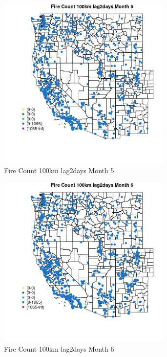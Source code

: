\begin{figure} 
\centering  
\includegraphics[width=0.77\textwidth]{Code_Outputs/Report_ML_input_PM25_Step4_part_f_de_duplicated_aveswNAs_MapObsMo5Fire_Count_100km_lag2days.jpg} 
\caption{\label{fig:Report_ML_input_PM25_Step4_part_f_de_duplicated_aveswNAsMapObsMo5Fire_Count_100km_lag2days}Fire Count 100km lag2days Month 5} 
\end{figure} 
 

\begin{figure} 
\centering  
\includegraphics[width=0.77\textwidth]{Code_Outputs/Report_ML_input_PM25_Step4_part_f_de_duplicated_aveswNAs_MapObsMo6Fire_Count_100km_lag2days.jpg} 
\caption{\label{fig:Report_ML_input_PM25_Step4_part_f_de_duplicated_aveswNAsMapObsMo6Fire_Count_100km_lag2days}Fire Count 100km lag2days Month 6} 
\end{figure} 
 


